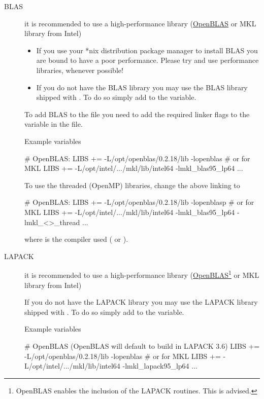 \begin{description}

  \item[BLAS] %
  it is recommended to use a high-performance library
  (\href{https://github.com/xianyi/OpenBLAS}{OpenBLAS} or MKL
  library from Intel)
  
  \begin{itemize}
    \item If you use your *nix distribution package manager to install
    BLAS you are bound to have a poor performance. Please try and use
    performance libraries, whenever possible!

    \item If you do not have the BLAS library you may use the BLAS
    library shipped with \siesta. To do so simply add
     to the  variable.
  \end{itemize}

  To add BLAS to the  file you need to add the
  required linker flags to the  variable in the
   file.

  Example variables
\begin{shellexample}
  # OpenBLAS:
  LIBS += -L/opt/openblas/0.2.18/lib -lopenblas
  # or for MKL
  LIBS += -L/opt/intel/.../mkl/lib/intel64 -lmkl_blas95_lp64 ...
\end{shellexample}

  To use the threaded (OpenMP) libraries, change the above linking
  to
\begin{shellexample}
  # OpenBLAS:
  LIBS += -L/opt/openblas/0.2.18/lib -lopenblasp
  # or for MKL
  LIBS += -L/opt/intel/.../mkl/lib/intel64 -lmkl_blas95_lp64
    -lmkl_<>_thread ...
\end{shellexample}
  where \shell{<>} is the compiler used ( or ).

  \item[LAPACK]%
  it is recommended to use a high-performance library
  (\href{https://github.com/xianyi/OpenBLAS}{OpenBLAS}\footnote{OpenBLAS
      enables the inclusion of the LAPACK routines. This is advised.}
  or MKL library from Intel)

  If you do not have the LAPACK library you may use the LAPACK
  library shipped with \siesta. To do so simply add
   to the  variable.

  Example variables
\begin{shellexample}
  # OpenBLAS (OpenBLAS will default to build in LAPACK 3.6)
  LIBS += -L/opt/openblas/0.2.18/lib -lopenblas
  # or for MKL
  LIBS += -L/opt/intel/.../mkl/lib/intel64 -lmkl_lapack95_lp64 ...
\end{shellexample}


\end{description}
